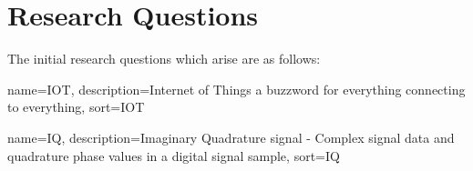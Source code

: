 \documentclass[runningheads,a4paper]{llncs}
\begin{document}
%
%
\newpage
\section*{Research Questions}
The initial research questions which arise are as follows:

%
{
  name={IOT},
  description={Internet of Things a buzzword for everything connecting to everything},
  sort=IOT
}

{
  name={IQ},
  description={Imaginary Quadrature signal - Complex signal data and quadrature phase values in a digital signal sample},
  sort=IQ
}
%
\end{document}

